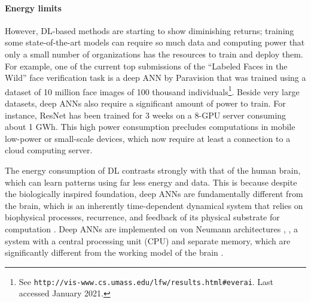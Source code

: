 \paragraph{Energy limits}
	However, DL-based methods are starting to show diminishing returns; training some state-of-the-art models can require so much data and computing power that only a small number of organizations has the resources to train and deploy them.
	For example, one of the current top submissions of the ``Labeled Faces in the Wild'' face verification task is a deep ANN by Paravision that was trained using a dataset of 10 million face images of 100 thousand individuals\footnote{See \texttt{http://vis-www.cs.umass.edu/lfw/results.html\#everai}. Last accessed January 2021.}.
	Beside very large datasets, deep ANNs also require a significant amount of power to train.
	For instance, ResNet \citep{he2016deep} has been trained for 3 weeks on a 8-GPU server consuming about 1 GWh.
	This high power consumption precludes computations in mobile low-power or small-scale devices, which now require at least a connection to a cloud computing server.

	The energy consumption of DL contrasts strongly with that of the human brain, which can learn patterns using far less energy and data.
	This is because despite the biologically inspired foundation, deep ANNs are fundamentally different from the brain, which is an inherently time-dependent dynamical system \citep{sacramento2018dendritic, wozniak2020deep} that relies on biophysical processes, recurrence, and feedback of its physical substrate for computation \citep{sterling2015principles,bhalla2014molecular}.
	Deep ANNs are implemented on von Neumann architectures \citep{von1993first}, \ie, a system with a central processing unit (CPU) and separate memory, which are significantly different from the working model of the brain \citep{schuman2017survey}.

